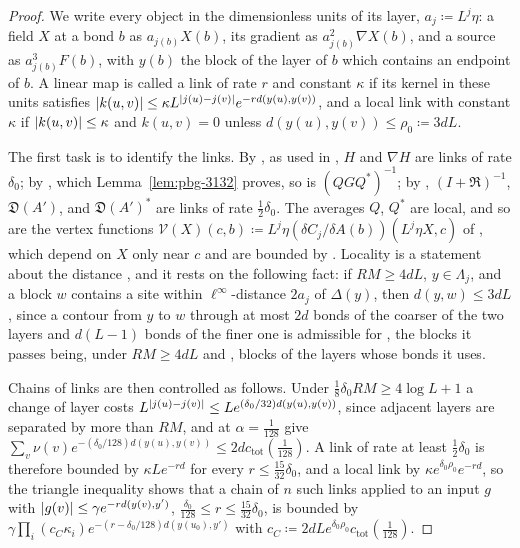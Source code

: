 \documentclass[11pt]{preprint}
\DeclarePairedDelimiter{\abs}{\lvert}{\rvert}
\numberwithin{equation}{section}
\theoremstyle{definition}
\theoremstyle{remark}
\theoremstyle{plain}
\begin{document}
\begin{proof}
We write every object in the dimensionless units of its layer, $a_j \coloneqq L^j\eta$: a field $X$ at a bond $b$ as $a_{j(b)}X(b)$, its gradient as $a_{j(b)}^2\nabla X(b)$, and a source as $a_{j(b)}^3F(b)$, with $y(b)$ the block of the layer of $b$ which contains an endpoint of $b$. A linear map is called a link of rate $r$ and constant $\kappa$ if its kernel in these units satisfies $\abs{k(u, v)} \leq \kappa L^{\abs{j(u)-j(v)}}e^{-rd(y(u),y(v))}$, and a local link with constant $\kappa$ if $\abs{k(u, v)} \leq \kappa$ and $k(u, v) = 0$ unless $d(y(u), y(v)) \leq \rho_0 \coloneqq 3dL$.

The first task is to identify the links. By \cite[(3.133)]{BalabanPBG}, as used in \cite[(46), (86)]{BalabanVAR}, $H$ and $\nabla H$ are links of rate $\delta_0$; by \cite[(3.132)]{BalabanPBG}, which Lemma~\ref{lem:pbg-3132} proves, so is $(QGQ^*)^{-1}$; by \cite[(71), (73)]{BalabanVAR}, $(I + \mathfrak R)^{-1}$, $\mathfrak D(A')$, and $\mathfrak D(A')^*$ are links of rate $\frac12\delta_0$. The averages $Q$, $Q^*$ are local, and so are the vertex functions $\mathcal V(X)(c, b) \coloneqq L^j\eta(\delta C_j/\delta A(b))(L^j\eta X, c)$ of \cite[(68), (70)]{BalabanVAR}, which depend on $X$ only near $c$ and are bounded by \cite[(72)]{BalabanVAR}. Locality is a statement about the distance \cite[(2.46), p.~231]{BalabanPRT2}, and it rests on the following fact: if $RM \geq 4dL$, $y \in \Lambda_j$, and a block $w$ contains a site within $\ell^\infty$-distance $2a_j$ of $\Delta(y)$, then $d(y, w) \leq 3dL$, since a contour from $y$ to $w$ through at most $2d$ bonds of the coarser of the two layers and $d(L - 1)$ bonds of the finer one is admissible for \cite[(2.46)]{BalabanPRT2}, the blocks it passes being, under $RM \geq 4dL$ and \cite[(2.2)]{BalabanPRT2}, blocks of the layers whose bonds it uses.

Chains of links are then controlled as follows. Under $\frac18\delta_0RM \geq 4\log L + 1$ a change of layer costs $L^{\abs{j(u)-j(v)}} \leq Le^{(\delta_0/32)d(y(u),y(v))}$, since adjacent layers are separated by more than $RM$, and \cite[(2.58)--(2.59)]{BalabanPRT2} at $\alpha = \frac1{128}$ give $\sum_v\nu(v)e^{-(\delta_0/128)d(y(u),y(v))} \leq 2dc_{\mathrm{tot}}(\frac1{128})$. A link of rate at least $\frac12\delta_0$ is therefore bounded by $\kappa Le^{-rd}$ for every $r \leq \frac{15}{32}\delta_0$, and a local link by $\kappa e^{\delta_0\rho_0}e^{-rd}$, so the triangle inequality \cite[(2.54)]{BalabanPRT2} shows that a chain of $n$ such links applied to an input $g$ with $\abs{g(v)} \leq \gamma e^{-rd(y(v),y')}$, $\frac{\delta_0}{128} \leq r \leq \frac{15}{32}\delta_0$, is bounded by $\gamma\prod_i(c_C\kappa_i)e^{-(r-\delta_0/128)d(y(u_0),y')}$ with $c_C \coloneqq 2dLe^{\delta_0\rho_0}c_{\mathrm{tot}}(\frac1{128})$.


\end{proof}
\end{document}
